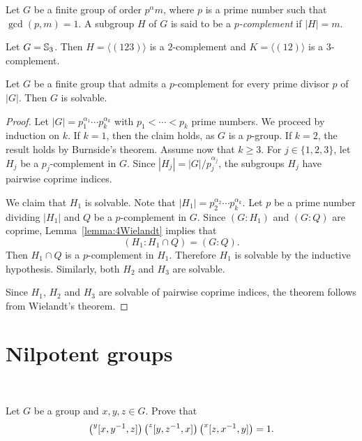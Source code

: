 \begin{definition}
Let $G$ be a finite group of order $p^{\alpha}m$, where $p$ is a prime number such that 
$\gcd(p,m)=1$. A subgroup 
$H$ of $G$ is said to be a \emph{$p$-complement} if $|H|=m$. 
\end{definition}

\begin{example}
Let $G=\mathbb{S}_3$. Then $H=\langle (123)\rangle$ is a $2$-complement and 
$K=\langle (12)\rangle$ is a $3$-complement.
\end{example}

\begin{theorem}[Hall]
\label{theorem:Hall:solvable}
Let $G$ be a finite group that admits a $p$-complement for every prime divisor $p$ of $|G|$. 
Then $G$ is solvable. 
\end{theorem}

\begin{proof}
	Let $|G|=p_1^{\alpha_1}\cdots
	p_k^{\alpha_k}$ with $p_1<\cdots<p_k$ prime numbers. We proceed by induction on $k$. 
	If $k=1$, then the claim holds, as $G$ is a $p$-group. If $k=2$, the result holds by
        Burnside's theorem. Assume now that 
	$k\geq3$. For $j\in\{1,2,3\}$, let $H_j$ be a $p_j$-complement in 
	$G$. Since $|H_j|=|G|/p_j^{\alpha_j}$, the subgroups $H_j$ have pairwise coprime indices.

	We claim that $H_1$ is solvable. Note that $|H_1|=p_2^{\alpha_2}\cdots
	p_k^{\alpha_k}$. Let $p$ be a prime number dividing $|H_1|$ and $Q$ be a 
	$p$-complement in $G$. 
	Since $(G:H_1)$ and $(G:Q)$ are
	coprime, Lemma~\ref{lemma:4Wielandt} implies that  
	\[
	(H_1:H_1\cap Q)=(G:Q). 
	\]
	Then $H_1\cap Q$ is a $p$-complement in $H_1$.  Therefore $H_1$ is
	solvable by the inductive hypothesis. Similarly, both $H_2$ and 
	$H_3$ are solvable.

	Since $H_1$, $H_2$ and $H_3$ are solvable of pairwise coprime indices, 
        the theorem follows from Wielandt's theorem. 
\end{proof}

\section{Nilpotent groups}\

\begin{exercise}
	\label{exercise:HallWitt}
	Let $G$ be a group and $x,y,z\in G$. Prove that 
	\begin{equation}
		\label{eq:HallWitt}
	\left(\prescript{y}{}[x,y^{-1},z]\right)\left(\prescript{z}{}[y,z^{-1},x]\right)\left(\prescript{x}{}[z,x^{-1},y]\right)=1.
	\end{equation}
\end{exercise}

